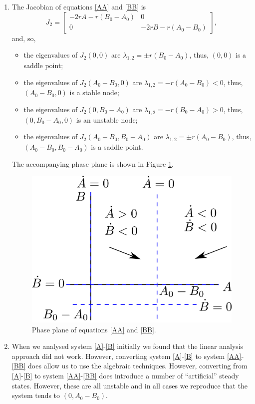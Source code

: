 \documentclass[10pt]{article}
\newcommand{\bb}{\begin{equation}}
\newcommand{\ee}{\end{equation}}
\newcommand{\fig}[1]{Figure \ref{#1}}
\newcommand{\eqns}[2]{equations \eqref{#1} and \eqref{#2}}
\newcommand{\ttp}{.45\textwidth}
\begin{document}
\begin{Answ}
\begin{enumerate}
\item The Jacobian of \eqns{AA}{BB} is
\bb
J_2=\left[ \begin{array}{cc}-2rA-r(B_0-A_0)&0\\
0&-2rB-r(A_0-B_0)
\end {array} \right],
\ee
and, so,
\begin{itemize}
\item the eigenvalues of $J_2(0,0)$ are $\lambda_{1,2}= \pm r(B_0-A_0)$, thus, $(0,0)$ is a saddle point;
\item the eigenvalues of $J_2(A_0-B_0,0)$ are $\lambda_{1,2}= -r(A_0-B_0)<0$, thus, $(A_0-B_0,0)$ is a stable node;
\item  the eigenvalues of $J_2(0,B_0-A_0)$ are $\lambda_{1,2}= -r(B_0-A_0)>0$, thus, $(0,B_0-A_0,0)$ is an unstable node;
\item  the eigenvalues of $J_2(A_0-B_0,B_0-A_0)$ are $\lambda_{1,2}= \pm r(A_0-B_0)$, thus, $(A_0-B_0,B_0-A_0)$ is a saddle point.
\end{itemize} 
The accompanying phase plane is shown in \fig{PPAB2}.
\begin{figure}[h!!!tb]
\centering
\includegraphics[width=\ttp]{../../Pictures/PPAB2.png}
\caption{\label{PPAB2} Phase plane of \eqns{AA}{BB}.}
\end{figure}


\item When we analysed system \eqref{A}-\eqref{B} initially we found that the linear analysis approach did not work. However, converting system \eqref{A}-\eqref{B}
to system \eqref{AA}-\eqref{BB} does allow us to use the algebraic techniques. However, converting from \eqref{A}-\eqref{B} to system \eqref{AA}-\eqref{BB} does introduce a number of ``artificial'' steady states. However, these are all unstable and in all cases we reproduce that the system tends to $(0,A_0-B_0)$.


\end{enumerate}
\end{Answ}
\end{document}
